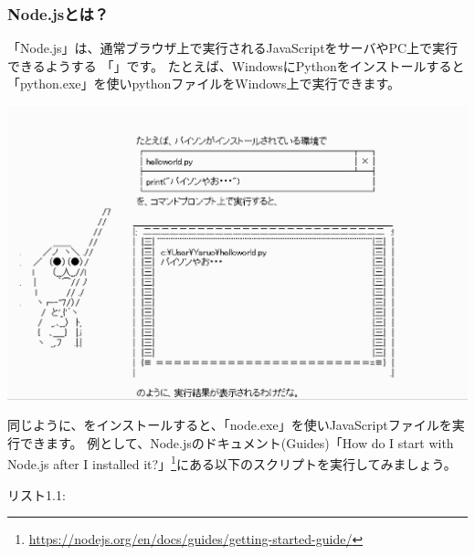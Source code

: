 \subsubsection*{Node.jsとは？}
\keeplastskip{
  \label{sec:1-1-1-1}
  \par\nobreak
}

「Node.js」は、通常ブラウザ上で実行されるJavaScriptをサーバやPC上で実行できるようする
「{}」です。
たとえば、WindowsにPythonをインストールすると「python.exe」を使いpythonファイルをWindows上で実行できます。

\begin{reviewimage}%
\includegraphics[width=1.0\maxwidth]{./images/01-createDevEnv/y01.png}%
\label{image:01-createDevEnv:y01}
\end{reviewimage}

同じように、{}をインストールすると、「node.exe」を使いJavaScriptファイルを実行できます。
例として、Node.jsのドキュメント(Guides)「How do I start with Node.js after I installed it?」\footnote{\url{https://nodejs.org/en/docs/guides/getting-started-guide/}}にある以下のスクリプトを実行してみましょう。


\clearpage

\def\startercodeblockfontsize{}
\begin{starterprogram}[_291809529]{リスト1.1: }\end{starterprogram}

